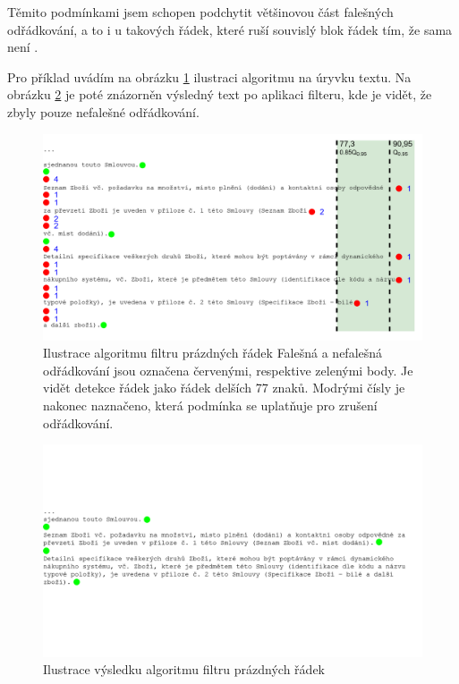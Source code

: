 \documentclass[thesis=M,czech]{FITthesis}[2019/12/23]
\newenvironment{example}{\begin{adjustwidth}{1cm}{}}{\end{adjustwidth}}
\begin{document}
Těmito podmínkami jsem schopen podchytit většinovou část falešných odřádkování, a to i u takových řádek, které ruší souvislý blok  řádek tím, že sama není .

    Pro příklad uvádím na obrázku \ref{fig:blanklinesfilter} ilustraci algoritmu na úryvku textu. Na obrázku \ref{fig:blanklinesfilteoutr} je poté znázorněn výsledný text po aplikaci filteru, kde je vidět, že zbyly pouze nefalešné odřádkování.
    
    \begin{figure}\centering
    	\includegraphics[width=1\textwidth]{images/blank_lines_filter.png}
    	\caption[Ilustrace algoritmu filtru prázdných řádek]{Ilustrace algoritmu filtru prázdných řádek\newline
    	Falešná a nefalešná odřádkování jsou označena červenými, respektive zelenými body. Je vidět detekce  řádek jako řádek delších 77 znaků. Modrými čísly je nakonec naznačeno, která podmínka se uplatňuje pro zrušení odřádkování.}\label{fig:blanklinesfilter}
    \end{figure}
    
    \begin{figure}\centering
    	\includegraphics[width=1\textwidth]{images/blank_lines_filter_out.png}
    	\caption{Ilustrace výsledku algoritmu filtru prázdných řádek}\label{fig:blanklinesfilteoutr}
    \end{figure}
\end{document}
